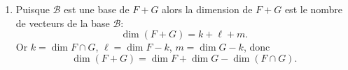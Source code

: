 {{\begin{enumerate}
Le reste de l'\'equation devient $a_1e_1+\cdots +a_ke_k+b_1f_1+\cdots +b_\ell f_\ell=0$,
or $(e_1,\ldots, e_k,f_1,\ldots,f_\ell)$ est une base de $F$ donc tous les coefficients 
$a_1,\ldots,a_k,b_1,\ldots,b_\ell$ sont nuls.

Bilan : tous les coefficients sont nuls donc la famille est libre. Comme elle \'etait g\'en\'eratrice, c'est une base.


  \item Puisque $\mathcal{B}$ est une base de $F+G$ alors la dimension de $F+G$ est le nombre de vecteurs de la base $\mathcal{B}$:
$$\dim (F+G) = k + \ell + m.$$
Or $k=\dim F\cap G$, $\ell = \dim F - k$, $m=\dim G - k$, donc 
$$\dim (F+G) = \dim F + \dim G - \dim (F\cap G).$$

\end{enumerate}}
}